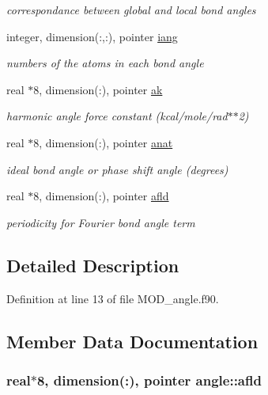 \begin{DoxyCompactItemize}
\begin{DoxyCompactList}\small\item\em correspondance between global and local bond angles \end{DoxyCompactList}\item 
integer, dimension(\-:,\-:), pointer \hyperlink{classangle_a43ce792d42ab6ec0953d3b0385e48710}{iang}
\begin{DoxyCompactList}\small\item\em numbers of the atoms in each bond angle \end{DoxyCompactList}\item 
real $\ast$8, dimension(\-:), pointer \hyperlink{classangle_a87407ebe9a2d1916f37c0c6278f4778e}{ak}
\begin{DoxyCompactList}\small\item\em harmonic angle force constant (kcal/mole/rad$\ast$$\ast$2) \end{DoxyCompactList}\item 
real $\ast$8, dimension(\-:), pointer \hyperlink{classangle_ac2eed7a08f383a7d650b4e7ff7ed9bff}{anat}
\begin{DoxyCompactList}\small\item\em ideal bond angle or phase shift angle (degrees) \end{DoxyCompactList}\item 
real $\ast$8, dimension(\-:), pointer \hyperlink{classangle_a5aac80b1ad70e4f4b35797bf329f9e92}{afld}
\begin{DoxyCompactList}\small\item\em periodicity for Fourier bond angle term \end{DoxyCompactList}\end{DoxyCompactItemize}


\subsection{Detailed Description}


Definition at line 13 of file M\-O\-D\-\_\-angle.\-f90.



\subsection{Member Data Documentation}
\hypertarget{classangle_a5aac80b1ad70e4f4b35797bf329f9e92}{
\subsubsection[{afld}]{\setlength{\rightskip}{0pt plus 5cm}real$\ast$8, dimension(\-:), pointer angle\-::afld}}\label{classangle_a5aac80b1ad70e4f4b35797bf329f9e92}


